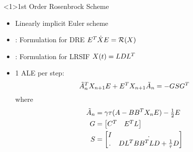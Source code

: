\begin{frame}<1>{1st Order Rosenbrock Scheme}
\begin{bigpicturecols}
  \begin{itemize}
    \item
      Linearly implicit Euler scheme
    \item
      \cite{Mena2007}: Formulation for DRE $E^T \dot X E = \operatorname{\mathcal R}(X)$
    \item
      \cite{Lang2017}: Formulation for LRSIF $X(t) = LDL^T$
    \item
      1 ALE per step:
      \begin{equation*}
        \tilde A_n^T X_{n+1} E + E^T X_{n+1} \tilde A_n = - GSG^T
      \end{equation*}
      where
      \begin{align*}
        \tilde A_n &= \gamma\tau(A-BB^T X_n E) - \tfrac{1}{2} E
        \\
        G &= \begin{bmatrix}
          C^T & E^T L
        \end{bmatrix}
        \\
        S &= \begin{bmatrix}
          I & . \\
          . & DL^T BB^T LD + \tfrac{1}{\tau} D
        \end{bmatrix}
      \end{align*}
      \vspace{-\baselineskip}
  \end{itemize}
  \vfill
\column{\bigpicturewidth}
\end{bigpicturecols}
\end{frame}

